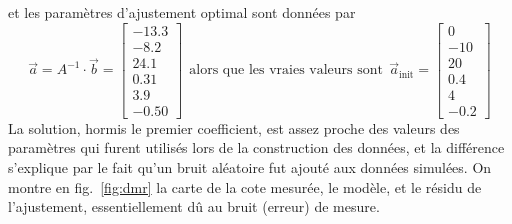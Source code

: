 et les paramètres d'ajustement optimal sont données par
\begin{equation}
    \vec{a}=A^{-1}\cdot\vec{b}=
    \begin{bmatrix}
        -13.3 \\
        -8.2  \\
        24.1  \\
        0.31  \\
        3.9   \\
        -0.50
    \end{bmatrix}
    \ \ \text{alors que les vraies valeurs sont}\ \ \vec{a}_{\text{init}}=
    \begin{bmatrix}
        0   \\
        -10 \\
        20  \\
        0.4 \\
        4   \\
        -0.2
    \end{bmatrix}
\end{equation}
La solution, hormis le premier coefficient, est assez proche des valeurs des paramètres qui furent utilisés lors de la construction des données, et la différence s'explique par le fait qu'un bruit aléatoire fut ajouté aux données simulées. On montre en fig.~\ref{fig:dmr} la carte de la cote mesurée, le modèle, et le résidu de l'ajustement, essentiellement dû au bruit (erreur) de mesure.

